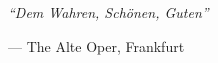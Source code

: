 \vspace*{\fill}
\epigraph{\textit{``Dem Wahren, Schönen, Guten''}}{--- The Alte Oper, Frankfurt}
\vspace*{\fill}
\thispagestyle{empty} %
\newpage